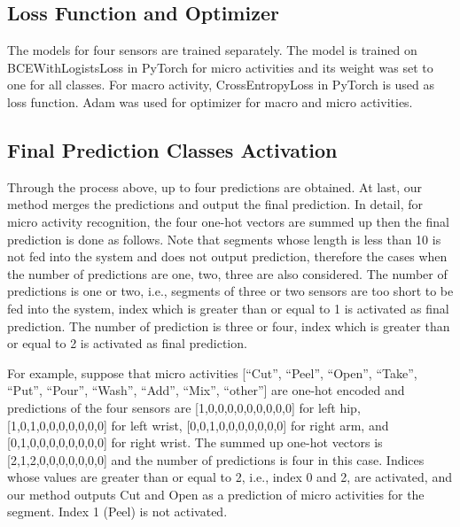 \documentclass{svmult}
\begin{document}
\subsection{Loss Function and Optimizer}
The models for four sensors are trained separately. The model is trained on BCEWithLogistsLoss in PyTorch for micro activities and its weight was set to one for all classes. For macro activity, CrossEntropyLoss in PyTorch is used as loss function. Adam was used for optimizer for macro and micro activities. 

\subsection{Final Prediction Classes Activation}
Through the process above, up to four predictions are obtained. At last, our method merges the predictions and output the final prediction.
In detail, for micro activity recognition, the four one-hot vectors are summed up then the final prediction is done as follows. Note that segments whose length is less than 10 is not fed into the system and does not output prediction, therefore the cases when the number of predictions are one, two, three are also considered. The number of predictions is one or two, i.e., segments of three or two sensors are too short to be fed into the system, index which is greater than or equal to 1 is activated as final prediction. The number of prediction is three or four, index which is greater than or equal to 2 is activated as final prediction. 


For example, suppose that micro activities [``Cut'', ``Peel'', ``Open'', ``Take'', ``Put'', ``Pour'', ``Wash'', ``Add'', ``Mix'', ``other''] are one-hot encoded and predictions of the four sensors are [1,0,0,0,0,0,0,0,0,0] for left hip, [1,0,1,0,0,0,0,0,0,0] for left wrist, [0,0,1,0,0,0,0,0,0,0] for right arm, and [0,1,0,0,0,0,0,0,0,0] for right wrist. The summed up one-hot vectors is [2,1,2,0,0,0,0,0,0,0] and the number of predictions is four in this case. Indices whose values are greater than or equal to 2, i.e., index 0 and 2, are activated, and our method outputs Cut and Open as a prediction of micro activities for the segment. Index 1 (Peel) is not activated.
\end{document}
